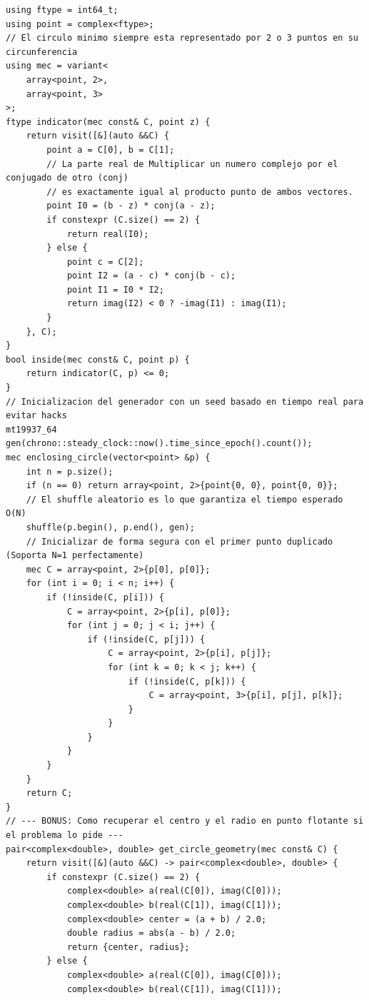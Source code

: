 \documentclass[10pt,landscape,twocolumn]{article}
\begin{document}
\begin{lstlisting}
using ftype = int64_t;
using point = complex<ftype>;
// El circulo minimo siempre esta representado por 2 o 3 puntos en su circunferencia
using mec = variant<
    array<point, 2>,
    array<point, 3>
>;
ftype indicator(mec const& C, point z) {
    return visit([&](auto &&C) {
        point a = C[0], b = C[1];
        // La parte real de Multiplicar un numero complejo por el conjugado de otro (conj) 
        // es exactamente igual al producto punto de ambos vectores.
        point I0 = (b - z) * conj(a - z);
        if constexpr (C.size() == 2) {
            return real(I0);
        } else {
            point c = C[2];
            point I2 = (a - c) * conj(b - c);
            point I1 = I0 * I2;
            return imag(I2) < 0 ? -imag(I1) : imag(I1);
        }
    }, C);
}
bool inside(mec const& C, point p) {
    return indicator(C, p) <= 0;
}
// Inicializacion del generador con un seed basado en tiempo real para evitar hacks
mt19937_64 gen(chrono::steady_clock::now().time_since_epoch().count());
mec enclosing_circle(vector<point> &p) {
    int n = p.size();
    if (n == 0) return array<point, 2>{point{0, 0}, point{0, 0}};
    // El shuffle aleatorio es lo que garantiza el tiempo esperado O(N)
    shuffle(p.begin(), p.end(), gen);
    // Inicializar de forma segura con el primer punto duplicado (Soporta N=1 perfectamente)
    mec C = array<point, 2>{p[0], p[0]};
    for (int i = 0; i < n; i++) {
        if (!inside(C, p[i])) {
            C = array<point, 2>{p[i], p[0]};
            for (int j = 0; j < i; j++) {
                if (!inside(C, p[j])) {
                    C = array<point, 2>{p[i], p[j]};
                    for (int k = 0; k < j; k++) {
                        if (!inside(C, p[k])) {
                            C = array<point, 3>{p[i], p[j], p[k]};
                        }
                    }
                }
            }
        }
    }
    return C;
}
// --- BONUS: Como recuperar el centro y el radio en punto flotante si el problema lo pide ---
pair<complex<double>, double> get_circle_geometry(mec const& C) {
    return visit([&](auto &&C) -> pair<complex<double>, double> {
        if constexpr (C.size() == 2) {
            complex<double> a(real(C[0]), imag(C[0]));
            complex<double> b(real(C[1]), imag(C[1]));
            complex<double> center = (a + b) / 2.0;
            double radius = abs(a - b) / 2.0;
            return {center, radius};
        } else {
            complex<double> a(real(C[0]), imag(C[0]));
            complex<double> b(real(C[1]), imag(C[1]));

\end{lstlisting}
\end{document}
